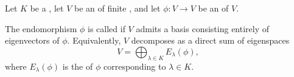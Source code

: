 \begin{definition} \label{definition:diagonalizable_endomorphism_of_a_vector_space_over_a_field}
Let $K$ be a , let $V$ be an  of finite , and let $\phi : V \to V$ be an  of $V$.

The endomorphism $\phi$ is called  if $V$ admits a basis consisting entirely of eigenvectors of $\phi$. Equivalently, $V$ decomposes as a direct sum of eigenspaces
$$V = \bigoplus_{\lambda \in K} E_\lambda(\phi),$$
where $E_\lambda(\phi)$ is the  of $\phi$ corresponding to $\lambda \in K$.
\end{definition}
